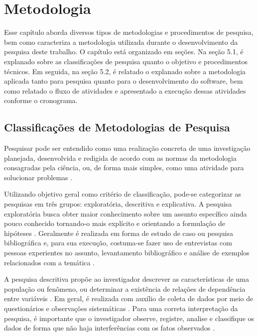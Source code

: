 \chapter[Metodologia]{Metodologia}
Esse capítulo aborda diversos tipos de metodologias e procedimentos de pesquisa, bem como caracteriza a metodologia utilizada durante o desenvolvimento da pesquisa deste trabalho. O capítulo está organizado em seções. Na seção 5.1, é explanado sobre as classificações de pesquisa quanto o objetivo e procedimentos técnicos. Em seguida, na seção 5.2, é relatado o explanado sobre a metodologia aplicada tanto para pesquisa quanto para o desenvolvimento do software, bem como relatado o fluxo de atividades e apresentado a execução dessas atividades conforme o cronograma.

 \section{Classificações de Metodologias de Pesquisa}
  
Pesquisar pode ser entendido como uma realização concreta de uma investigação planejada, desenvolvida e redigida de acordo com as normas da metodologia consagradas pela ciência, ou, de forma mais simples, como uma atividade para solucionar problemas \cite{kauark2010} \cite{ruiz1996}. 

 \par
  \indent Utilizando objetivo geral como critério de classificação, pode-se categorizar as pesquisas em três grupos: exploratória, descritiva e explicativa. A pesquisa exploratória busca obter maior conhecimento sobre um assunto específico ainda pouco conhecido tornando-o mais explícito e orientando a formulação de hipóteses \cite{gil2002}. Geralmente é realizada em forma de estudo de caso ou pesquisa bibliográfica \cite{rodrigues2007} e, para sua execução, costuma-se fazer uso de entrevistas com pessoas experientes no assunto, levantamento bibliográfico e análise de exemplos relacionados com a temática \cite{gil2002}. 

 \par
  \indent A pesquisa descritiva propõe ao investigador descrever as características de uma população ou fenômeno, ou determinar a existência de relações de dependência entre variáveis \cite{gil2002}.  Em geral, é realizada com auxílio de coleta de dados por meio de questionários e observações sistemáticas \cite{tafner2007}. Para uma correta interpretação da pesquisa, é importante que o investigador observe, registre, analise e classifique os dados de forma que não haja interferências com os fatos observados \cite{rodrigues2007}. 

